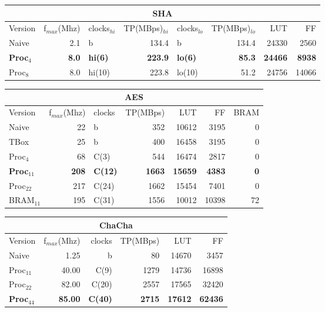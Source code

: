 \begin{frame}
\begin{minipage}[b]{0.65\textwidth}
\begin{tabular}{l r l r l r r r}
\end{tabular}
\begin{tabular}{l r l r l r r r}
\multicolumn{8}{c}{SHA}\\
\hline
Version & f$_{max}$(Mhz) & clocks$_{hi}$ & TP(MBps)$_{hi}$ &clocks$_{lo}$ & TP(MBps)$_{lo}$ & LUT & FF\\
\hline
Naive    & 2.1 & b & 134.4 & b &  134.4 & 24330 & 2560\\
\textbf{Proc}$_{4}$ & \textbf{8.0} & \textbf{hi(6)} &        \textbf{223.9} & \textbf{lo(6)} & \textbf{85.3} & \textbf{24466} & \textbf{8938}\\
Proc$_{8}$ & 8.0 & hi(10) &       223.8 & lo(10) & 51.2 & 24756 & 14066\\
\end{tabular}
\begin{tabular}{l r l r r r r}
\multicolumn{7}{c}{AES}\\
\hline
Version & f$_{max}$(Mhz) & clocks & TP(MBps) & LUT & FF & BRAM\\
\hline
Naive      &   22 & b          & 352    & 10612     &  3195 & 0\\
TBox       &  25 & b           & 400 & 16458 & 3195 & 0\\
Proc$_{4}$  &  68 & C(3) &        544 & 16474 & 2817 & 0\\
\textbf{Proc}$_{11}$ & \textbf{208} & \textbf{C(12)} &      \textbf{1663} & \textbf{15659} & \textbf{4383} & \textbf{0}\\
Proc$_{22}$ & 217 & C(24) &      1662 & 15454 & 7401 & 0\\
BRAM$_{11}$ & 195 & C(31)  &     1556 & 10012 & 10398 & 72
\end{tabular}
\begin{tabular}{l r r r r r}
\multicolumn{6}{c}{ChaCha}\\
\hline
Version & f$_{max}$(Mhz) & clocks & TP(MBps) & LUT & FF\\
\hline
Naive  & 1.25 & b & 80           & 14670 & 3457\\
Proc$_{11}$ & 40.00 & C(9) & 1279 &  14736 & 16898\\
Proc$_{22}$ & 82.00 & C(20) & 2557 &  17565 & 32420\\
\textbf{Proc}$_{44}$ & \textbf{85.00} & \textbf{C(40)} & \textbf{2715} & \textbf{17612} & \textbf{62436}\\
\end{tabular}
\end{minipage}
\end{frame}


